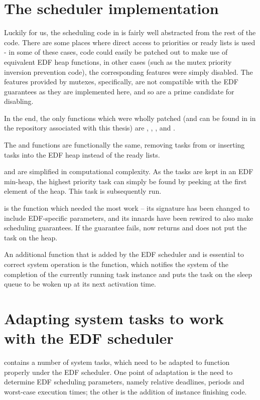 \section{The scheduler implementation}
Luckily for us, the scheduling code in \ucosiii is fairly well abstracted from the rest of the code. There are some places where direct access to priorities or ready lists is used - in some of these cases, code could easily be patched out to make use of equivalent EDF heap functions, in other cases (such as the mutex priority inversion prevention code), the corresponding features were simply disabled. The features provided by mutexes, specifically, are not compatible with the EDF guarantees as they are implemented here, and so are a prime candidate for disabling.

In the end, the only functions which were wholly patched (and can be found in  in the repository associated with this thesis) are , , ,  and .

The  and  functions are functionally the same, removing tasks from or inserting tasks into the EDF heap instead of the ready lists.

 and  are simplified in computational complexity. As the tasks are kept in an EDF min-heap, the highest priority task can simply be found by peeking at the first element of the heap. This task is subsequently run.

 is the function which needed the most work -- its signature has been changed to include EDF-specific parameters, and its innards have been rewired to also make scheduling guarantees. If the guarantee fails,  now returns  and does not put the task on the heap.

An additional function that is added by the EDF scheduler and is essential to correct system operation is the  function, which notifies the system of the completion of the currently running task instance and puts the task on the sleep queue to be woken up at its next activation time.

\section{Adapting system tasks to work with the EDF scheduler}
\ucosiii contains a number of system tasks, which need to be adapted to function properly under the EDF scheduler. One point of adaptation is the need to determine EDF scheduling parameters, namely relative deadlines, periods and worst-case execution times; the other is the addition of instance finishing code.

